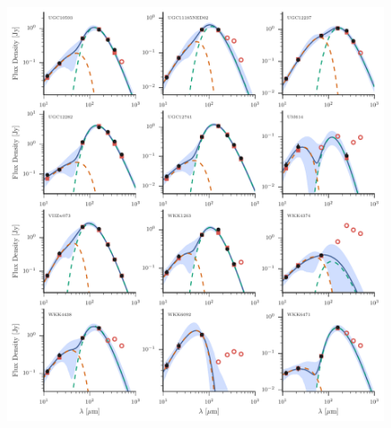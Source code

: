 \begin{figure}
\centering
\includegraphics[width=\textwidth]{figures/sedfig26}
\caption{}
\end{figure}